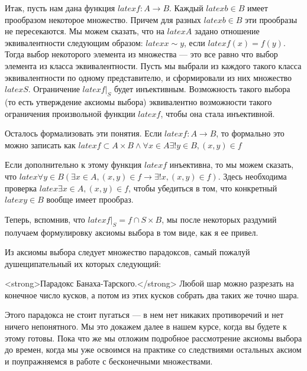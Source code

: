 Итак, пусть нам дана функция $latex f: A\to B$. Каждый $latex b \in B$ имеет прообразом некоторое множество. Причем для разных $latex b\in B$ эти прообразы не пересекаются. Мы можем сказать, что на $latex A$ задано отношение эквивалентности следующим образом: $latex x\sim y$, если $latex f(x) = f(y)$. Тогда выбор некоторого элемента из множества — это все равно что выбор элемента из класса эквивалентности. Пусть мы выбрали из каждого такого класса эквивалентности по одному представителю, и сформировали из них множество $latex S$. Ограничение $latex f|_S$ будет инъективным. Возможность такого выбора (то есть утверждение аксиомы выбора) эквивалентно возможности такого ограничения произвольной функции $latex f$, чтобы она стала инъективной.

Осталось формализовать эти понятия. Если $latex f: A\to B$, то формально это можно записать как $latex f\subset A\times B \wedge \forall x \in A \exists!y\in B, (x, y)\in f$

Если дополнительно к этому функция $latex f$ инъективна, то мы можем сказать, что $latex \forall y\in B (\exists x\in A, (x, y)\in f \rightarrow \exists!x, (x, y)\in f)$. Здесь необходима проверка $latex \exists x\in A, (x, y)\in f$, чтобы убедиться в том, что конкретный $latex y\in B$ вообще имеет прообраз.

Теперь, вспомнив, что $latex f|_S = f\cap S\times B$, мы после некоторых раздумий получаем формулировку аксиомы выбора в том виде, как я ее привел.

Из аксиомы выбора следует множество парадоксов, самый пожалуй душещипательный их которых следующий:

<strong>Парадокс Банаха-Тарского.</strong> Любой шар можно разрезать на конечное число кусков, а потом из этих кусков собрать два таких же точно шара.

Этого парадокса не стоит пугаться — в нем нет никаких противоречий и нет ничего непонятного. Мы это докажем далее в нашем курсе, когда вы будете к этому готовы. Пока что же мы отложим подробное рассмотрение аксиомы выбора до времен, когда мы уже освоимся на практике со следствиями остальных аксиом и поупражняемся в работе с бесконечными множествами.
